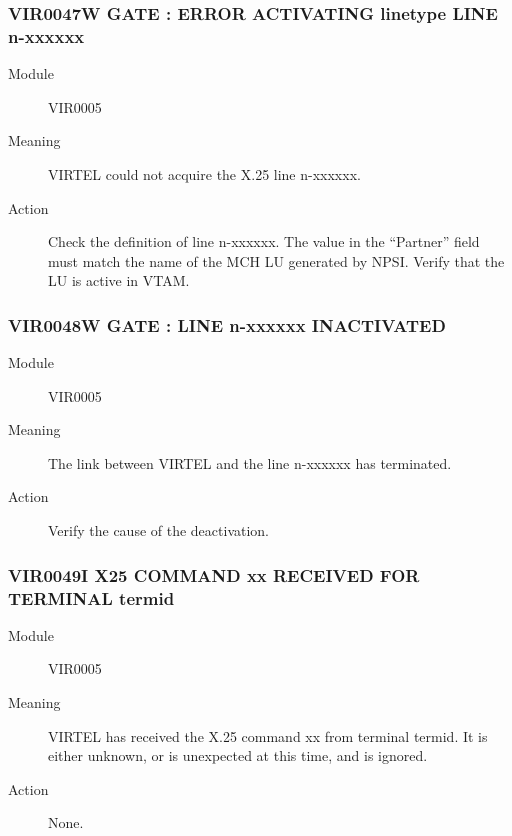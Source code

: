 \documentclass[letterpaper,10pt,english]{sphinxmanual}
\begin{document}
\subsubsection{VIR0047W GATE : ERROR ACTIVATING linetype LINE n-xxxxxx}
\label{\detokenize{messages:vir0047w-gate-error-activating-linetype-line-n-xxxxxx}}\begin{description}
\item[{Module}] \leavevmode
VIR0005

\item[{Meaning}] \leavevmode
VIRTEL could not acquire the X.25 line n-xxxxxx.

\item[{Action}] \leavevmode
Check the definition of line n-xxxxxx. The value in the “Partner” field must match the name of the MCH LU generated by NPSI. Verify that the LU is active in VTAM.

\end{description}


\subsubsection{VIR0048W GATE : LINE n-xxxxxx INACTIVATED}
\label{\detokenize{messages:vir0048w-gate-line-n-xxxxxx-inactivated}}\begin{description}
\item[{Module}] \leavevmode
VIR0005

\item[{Meaning}] \leavevmode
The link between VIRTEL and the line n-xxxxxx has terminated.

\item[{Action}] \leavevmode
Verify the cause of the deactivation.

\end{description}


\subsubsection{VIR0049I X25 COMMAND xx RECEIVED FOR TERMINAL termid}
\label{\detokenize{messages:vir0049i-x25-command-xx-received-for-terminal-termid}}\begin{description}
\item[{Module}] \leavevmode
VIR0005

\item[{Meaning}] \leavevmode
VIRTEL has received the X.25 command xx from terminal termid. It is either unknown, or is unexpected at this time, and is ignored.

\item[{Action}] \leavevmode
None.

\end{description}
\end{document}
